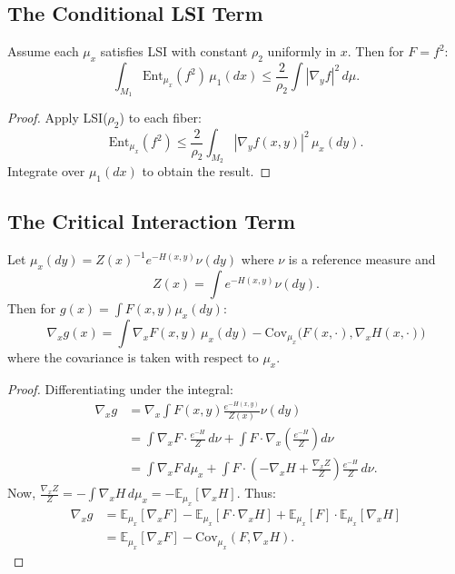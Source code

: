\subsection{The Conditional LSI Term}

\begin{lemma}\label{lem:conditional-term}
Assume each $\mu_x$ satisfies LSI with constant $\rho_2$ uniformly in $x$. Then for $F = f^2$:
\begin{equation}
    \int_{M_1} \mathrm{Ent}_{\mu_x}(f^2) \, \mu_1(dx) \leq \frac{2}{\rho_2} \int |\nabla_y f|^2 \, d\mu.
\end{equation}
\end{lemma}

\begin{proof}
Apply LSI($\rho_2$) to each fiber:
\begin{equation}
    \mathrm{Ent}_{\mu_x}(f^2) \leq \frac{2}{\rho_2} \int_{M_2} |\nabla_y f(x,y)|^2 \, \mu_x(dy).
\end{equation}
Integrate over $\mu_1(dx)$ to obtain the result.
\end{proof}

\subsection{The Critical Interaction Term}

\begin{theorem}\label{thm:gradient-conditional}
Let $\mu_x(dy) = Z(x)^{-1} e^{-H(x,y)} \nu(dy)$ where $\nu$ is a reference measure and 
\begin{equation}
    Z(x) = \int e^{-H(x,y)} \nu(dy).
\end{equation}
Then for $g(x) = \int F(x,y) \mu_x(dy)$:
\begin{equation}
    \nabla_x g(x) = \int \nabla_x F(x,y) \, \mu_x(dy) - \mathrm{Cov}_{\mu_x}\big(F(x,\cdot), \nabla_x H(x,\cdot)\big)
\end{equation}
where the covariance is taken with respect to $\mu_x$.
\end{theorem}

\begin{proof}
Differentiating under the integral:
\begin{align}
    \nabla_x g &= \nabla_x \int F(x,y) \frac{e^{-H(x,y)}}{Z(x)} \nu(dy) \\
    &= \int \nabla_x F \cdot \frac{e^{-H}}{Z} \, d\nu + \int F \cdot \nabla_x\left(\frac{e^{-H}}{Z}\right) d\nu \\
    &= \int \nabla_x F \, d\mu_x + \int F \cdot \left( -\nabla_x H + \frac{\nabla_x Z}{Z} \right) \frac{e^{-H}}{Z} \, d\nu.
\end{align}
Now, $\frac{\nabla_x Z}{Z} = -\int \nabla_x H \, d\mu_x = -\mathbb{E}_{\mu_x}[\nabla_x H]$. Thus:
\begin{align}
    \nabla_x g &= \mathbb{E}_{\mu_x}[\nabla_x F] - \mathbb{E}_{\mu_x}[F \cdot \nabla_x H] + \mathbb{E}_{\mu_x}[F] \cdot \mathbb{E}_{\mu_x}[\nabla_x H] \\
    &= \mathbb{E}_{\mu_x}[\nabla_x F] - \mathrm{Cov}_{\mu_x}(F, \nabla_x H).
\end{align}
\end{proof}

